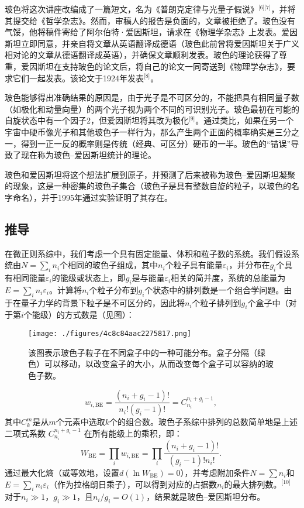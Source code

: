 玻色将这次讲座改编成了一篇短文，名为《普朗克定律与光量子假说》\(^\text{[6][7]}\)，并将其提交给《哲学杂志》。然而，审稿人的报告是负面的，文章被拒绝了。玻色没有气馁，他将稿件寄给了阿尔伯特·爱因斯坦，请求在《物理学杂志》上发表。爱因斯坦立即同意，并亲自将文章从英语翻译成德语（玻色此前曾将爱因斯坦关于广义相对论的文章从德语翻译成英语），并确保文章顺利发表。玻色的理论获得了尊重，爱因斯坦在支持玻色的论文后，将自己的论文一同寄送到《物理学杂志》，要求它们一起发表。该论文于1924年发表\(^\text{[8]}\)。

玻色能够得出准确结果的原因是，由于光子是不可区分的，不能把具有相同量子数（如极化和动量向量）的两个光子视为两个不同的可识别光子。玻色最初在可能的自旋状态中有一个因子2，但爱因斯坦将其改为极化\(^\text{[9]}\)。通过类比，如果在另一个宇宙中硬币像光子和其他玻色子一样行为，那么产生两个正面的概率确实是三分之一，得到一正一反的概率则是传统（经典、可区分）硬币的一半。玻色的“错误”导致了现在称为玻色–爱因斯坦统计的理论。

玻色和爱因斯坦将这个想法扩展到原子，并预测了后来被称为玻色–爱因斯坦凝聚的现象，这是一种密集的玻色子集合（玻色子是具有整数自旋的粒子，以玻色的名字命名），并于1995年通过实验证明了其存在。
\subsection{推导}  
在微正则系综中，我们考虑一个具有固定能量、体积和粒子数的系统。我们假设系统由\(N = \sum_i n_i\)个相同的玻色子组成，其中\(n_i\)个粒子具有能量\( \varepsilon_i\)，并分布在\( g_i \)个具有相同能量\(\varepsilon_i\)的能级或状态上，即\( g_i \)是与能量\(\varepsilon_i\)相关的简并度，系统的总能量为\(E = \sum_i n_i \varepsilon_i\)。计算将\( n_i\)个粒子分布到\( g_i\)个状态中的排列数是一个组合学问题。由于在量子力学的背景下粒子是不可区分的，因此将\( n_i \)个粒子排列到\( g_i \)个盒子中（对于第\( i \)个能级）的方式数是（见图）：
\begin{figure}[ht]
\centering
\texttt{[image: ./figures/4c8c84aac2275817.png]}
\caption{该图表示玻色子粒子在不同盒子中的一种可能分布。盒子分隔（绿色）可以移动，以改变盒子的大小，从而改变每个盒子可以容纳的玻色子数。} \label{fig_BSAYST_2}
\end{figure}
\[
w_{i,{\text{BE}}} = \frac{(n_{i}+g_{i}-1)!}{n_{i}!(g_{i}-1)!} = C_{n_{i}}^{n_{i}+g_{i}-1},~
\]
其中\( C_{k}^{m} \)是从\( m \)个元素中选取\( k \)个的组合数。玻色子系综中排列的总数简单地是上述二项式系数 \( C_{n_i}^{n_i+g_i-1} \) 在所有能级上的乘积，即：
\[
W_{\text{BE}} = \prod_i w_{i,{\text{BE}}} = \prod_i \frac{(n_i + g_i - 1)!}{(g_i - 1)! n_i!}.~
\]
通过最大化熵（或等效地，设置\(d(\ln W_{\text{BE}}) = 0\)），并考虑附加条件\( N = \sum n_i \)和\( E = \sum_i n_i \varepsilon_i\)（作为拉格朗日乘子），可以得到对应的占据数\(n_i\)的最大排列数。\(^\text{[10]}\) 对于\( n_i \gg 1 \)，\( g_i \gg 1\)，且\( n_i / g_i = O(1) \)，结果就是玻色–爱因斯坦分布。
